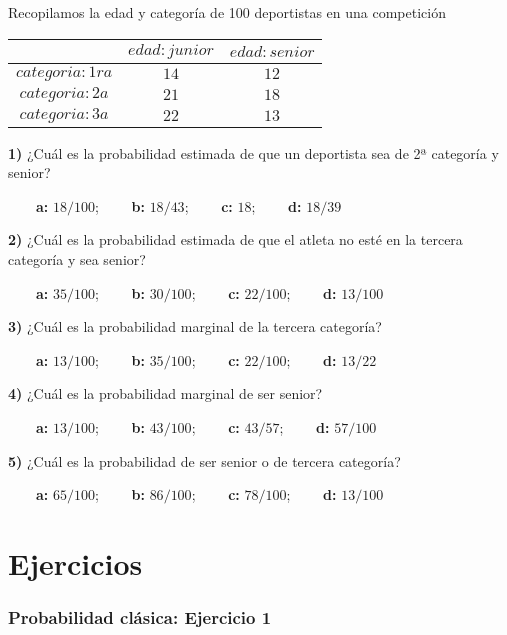 \documentclass[
]{book}
\begin{document}
Recopilamos la edad y categoría de 100 deportistas en una competición

\begin{longtable}[]{@{}ccc@{}}
\toprule
& \(edad:junior\) & \(edad:senior\) \\
\midrule
\endhead
\(categoria:1ra\) & \(14\) & \(12\) \\
\(categoria:2a\) & \(21\) & \(18\) \\
\(categoria:3a\) & \(22\) & \(13\) \\
\bottomrule
\end{longtable}

\textbf{1)} ¿Cuál es la probabilidad estimada de que un deportista sea de 2ª categoría y senior?

\textbf{\(\qquad\)a:} \(18/100\); \textbf{\(\qquad\)b:} \(18/43\); \textbf{\(\qquad\)c:} \(18\); \textbf{\(\qquad\)d:} \(18/39\)

\textbf{2)} ¿Cuál es la probabilidad estimada de que el atleta no esté en la tercera categoría y sea senior?

\textbf{\(\qquad\)a:} \(35/100\); \textbf{\(\qquad\)b:} \(30/100\); \textbf{\(\qquad\)c:} \(22/100\); \textbf{\(\qquad\)d:} \(13/100\)

\textbf{3)} ¿Cuál es la probabilidad marginal de la tercera categoría?

\textbf{\(\qquad\)a:} \(13/100\); \textbf{\(\qquad\)b:} \(35/100\); \textbf{\(\qquad\)c:} \(22/100\); \textbf{\(\qquad\)d:} \(13/22\)

\textbf{4)} ¿Cuál es la probabilidad marginal de ser senior?

\textbf{\(\qquad\)a:} \(13/100\); \textbf{\(\qquad\)b:} \(43/100\); \textbf{\(\qquad\)c:} \(43/57\); \textbf{\(\qquad\)d:} \(57/100\)

\textbf{5)} ¿Cuál es la probabilidad de ser senior o de tercera categoría?

\textbf{\(\qquad\)a:} \(65/100\); \textbf{\(\qquad\)b:} \(86/100\); \textbf{\(\qquad\)c:} \(78/100\); \textbf{\(\qquad\)d:} \(13/100\)

\hypertarget{ejercicios-1}{%
\section{Ejercicios}\label{ejercicios-1}}

\hypertarget{probabilidad-cluxe1sica-ejercicio-1}{%
\subsubsection{Probabilidad clásica: Ejercicio 1}\label{probabilidad-cluxe1sica-ejercicio-1}}
\end{document}
